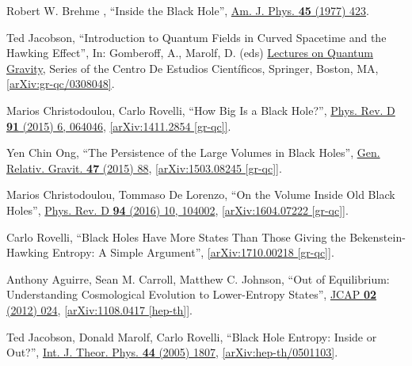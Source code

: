\documentclass[preprintnumbers, floatfix, preprintnumbers, letterpaper, twocolumn, superscriptaddress,nofootinbib]{revtex4-2}
\begin{document}
\begin{thebibliography}{99}
Robert W. Brehme , ``Inside the Black Hole'', {\hypersetup{urlcolor=vividviolet}\href{https://pubs.aip.org/aapt/ajp/article-abstract/45/5/423/1050671/Inside-the-black-hole?redirectedFrom=fulltext}{Am. J. Phys. \textbf{45} (1977) 423}}.

Ted Jacobson, ``Introduction to Quantum Fields in Curved Spacetime and the Hawking Effect'', In: Gomberoff, A., Marolf, D. (eds) {\hypersetup{urlcolor=vividviolet}\href{https://doi.org/10.1007/0-387-24992-3_2}{Lectures on Quantum Gravity}}, Series of the Centro De Estudios Científicos, Springer, Boston, MA, \href{https://arxiv.org/abs/gr-qc/0308048}{[arXiv:gr-qc/0308048]}.

Marios Christodoulou, Carlo Rovelli, ``How Big Is a Black Hole?'', {\hypersetup{urlcolor=vividviolet}\href{https://journals.aps.org/prd/abstract/10.1103/PhysRevD.91.064046}{Phys. Rev. D \textbf{91} (2015) 6, 064046}}, \href{https://arxiv.org/abs/1411.2854}{[arXiv:1411.2854 [gr-qc]]}.


Yen Chin Ong, ``The Persistence of the Large Volumes in Black Holes'', {\hypersetup{urlcolor=vividviolet}\href{https://link.springer.com/article/10.1007/s10714-015-1929-x}{Gen. Relativ. Gravit. \textbf{47} (2015) 88}}, \href{https://arxiv.org/abs/1503.08245}{[arXiv:1503.08245 [gr-qc]]}.

Marios Christodoulou, Tommaso De Lorenzo, ``On the Volume Inside Old Black Holes'', {\hypersetup{urlcolor=vividviolet}\href{https://journals.aps.org/prd/abstract/10.1103/PhysRevD.94.104002}{Phys. Rev. D \textbf{94} (2016) 10, 104002}}, \href{https://arxiv.org/abs/1604.07222}{[arXiv:1604.07222 [gr-qc]]}.

Carlo Rovelli, ``Black Holes Have More States Than Those Giving the Bekenstein-Hawking Entropy: A Simple Argument'', \href{https://arxiv.org/abs/1710.00218}{[arXiv:1710.00218 [gr-qc]]}.


Anthony Aguirre, Sean M. Carroll, Matthew C. Johnson, ``Out of Equilibrium: Understanding Cosmological Evolution to Lower-Entropy States'', {\hypersetup{urlcolor=vividviolet}\href{https://iopscience.iop.org/article/10.1088/1475-7516/2012/02/024}{JCAP \textbf{02} (2012) 024}}, \href{https://arxiv.org/abs/1108.0417}{[arXiv:1108.0417 [hep-th]]}.


Ted Jacobson, Donald Marolf, Carlo Rovelli, ``Black Hole Entropy: Inside or Out?'', 	{\hypersetup{urlcolor=vividviolet}\href{https://link.springer.com/article/10.1007/s10773-005-8896-z}{Int. J. Theor. Phys. \textbf{44} (2005) 1807}}, \href{https://arxiv.org/abs/hep-th/0501103}{[arXiv:hep-th/0501103]}.


\end{thebibliography}
\end{document}
